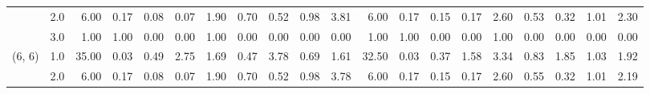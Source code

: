 \begin{tabular}{llrrrrrrrrrrrrrrrrrr}
       & 2.0 &               6.00 &                     0.17 &                                 0.08 &                             0.07 &                           1.90 &                                               0.70 &                                            0.52 &                                            0.98 &                                        3.81 &               6.00 &                     0.17 &                                 0.15 &                             0.17 &                           2.60 &                                               0.53 &                                            0.32 &                                            1.01 &                                        2.30 \\
       & 3.0 &               1.00 &                     1.00 &                                 0.00 &                             0.00 &                           1.00 &                                               0.00 &                                            0.00 &                                            0.00 &                                        0.00 &               1.00 &                     1.00 &                                 0.00 &                             0.00 &                           1.00 &                                               0.00 &                                            0.00 &                                            0.00 &                                        0.00 \\
(6, 6) & 1.0 &              35.00 &                     0.03 &                                 0.49 &                             2.75 &                           1.69 &                                               0.47 &                                            3.78 &                                            0.69 &                                        1.61 &              32.50 &                     0.03 &                                 0.37 &                             1.58 &                           3.34 &                                               0.83 &                                            1.85 &                                            1.03 &                                        1.92 \\
       & 2.0 &               6.00 &                     0.17 &                                 0.08 &                             0.07 &                           1.90 &                                               0.70 &                                            0.52 &                                            0.98 &                                        3.78 &               6.00 &                     0.17 &                                 0.15 &                             0.17 &                           2.60 &                                               0.55 &                                            0.32 &                                            1.01 &                                        2.19 \\

\end{tabular}
